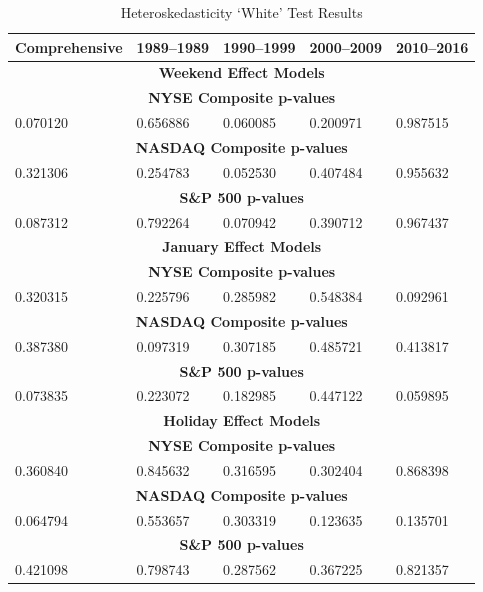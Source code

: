 \documentclass[11pt, english]{article}
\begin{document}
	\begin{table}[h]
		\scriptsize
		\renewcommand{\arraystretch}{1.25}
	\begin{center}
	\begin{tabular}{p{2.25cm}p{2.25cm}p{2.25cm}p{2.25cm}p{2.25cm}}
		\textbf{Comprehensive} & \textbf{1989--1989} & \textbf{1990--1999} & \textbf{2000--2009} & \textbf{2010--2016}\\
		\hline
		\hline
		\multicolumn{5}{c}{\textbf{Weekend Effect Models}}\\
		\hline
		\hline
		\multicolumn{5}{c}{\textbf{NYSE Composite p-values}}\\
		\hline
		0.070120 & 0.656886 & 0.060085 & 0.200971 & 0.987515\\
		\hline
		\multicolumn{5}{c}{\textbf{NASDAQ Composite p-values}}\\
		\hline
		0.321306 & 0.254783 & 0.052530 & 0.407484 & 0.955632\\
		\hline
		\multicolumn{5}{c}{\textbf{S\&P 500 p-values}}\\
		\hline
		0.087312 & 0.792264 & 0.070942 & 0.390712 & 0.967437\\
		\hline
		\hline
		\multicolumn{5}{c}{\textbf{January Effect Models}}\\
                \hline
                \hline
                \multicolumn{5}{c}{\textbf{NYSE Composite p-values}}\\
		\hline
		0.320315 & 0.225796 & 0.285982 & 0.548384 & 0.092961\\
		\hline
		\multicolumn{5}{c}{\textbf{NASDAQ Composite p-values}}\\
		\hline
		0.387380 & 0.097319 & 0.307185 & 0.485721 & 0.413817\\
		\hline 
		\multicolumn{5}{c}{\textbf{S\&P 500 p-values}}\\
		\hline
		0.073835 & 0.223072 & 0.182985 & 0.447122 & 0.059895\\
		\hline
		\hline
		\multicolumn{5}{c}{\textbf{Holiday Effect Models}}\\
		\hline
		\hline
		\multicolumn{5}{c}{\textbf{NYSE Composite p-values}}\\
		\hline
		0.360840 & 0.845632 & 0.316595 & 0.302404 & 0.868398\\
		\hline
                \multicolumn{5}{c}{\textbf{NASDAQ Composite p-values}}\\
		\hline
		0.064794 & 0.553657 & 0.303319 & 0.123635 & 0.135701\\
		\hline
                \multicolumn{5}{c}{\textbf{S\&P 500 p-values}}\\
		\hline
		0.421098 & 0.798743 & 0.287562 & 0.367225 & 0.821357\\
		\hline
	\end{tabular}
		\caption{Heteroskedasticity `White' Test Results}
	\end{center}
	\end{table}
\end{document}
